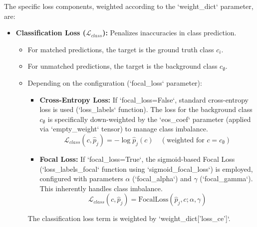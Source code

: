 The specific loss components, weighted according to the `weight_dict` parameter, are:
\begin{itemize}
    \item \textbf{Classification Loss ($ \mathcal{L}_{class} $):} Penalizes inaccuracies in class prediction.
        \begin{itemize}
            \item For matched predictions, the target is the ground truth class $ c_i $.
            \item For unmatched predictions, the target is the background class $ c_{\emptyset} $.
            \item Depending on the configuration (`focal_loss` parameter):
                \begin{itemize}
                    \item \textbf{Cross-Entropy Loss:} If `focal_loss=False`, standard cross-entropy loss is used (`loss_labels` function). The loss for the background class $ c_{\emptyset} $ is specifically down-weighted by the `eos_coef` parameter (applied via `empty_weight` tensor) to manage class imbalance.
                    \begin{equation}
                         \mathcal{L}_{class}(c, \hat{p}_j) = -\log \hat{p}_j(c) \quad (\text{weighted for } c=c_{\emptyset})
                    \end{equation}
                    \item \textbf{Focal Loss:} If `focal_loss=True`, the sigmoid-based Focal Loss (`loss_labels_focal` function using `sigmoid_focal_loss`) is employed, configured with parameters $ \alpha $ (`focal_alpha`) and $ \gamma $ (`focal_gamma`). This inherently handles class imbalance.
                    \begin{equation}
                         \mathcal{L}_{class}(c, \hat{p}_j) = \text{FocalLoss}(\hat{p}_j, c; \alpha, \gamma)
                    \end{equation}
                \end{itemize}
        The classification loss term is weighted by `weight_dict['loss_ce']`.


\end{itemize}
\end{itemize}
